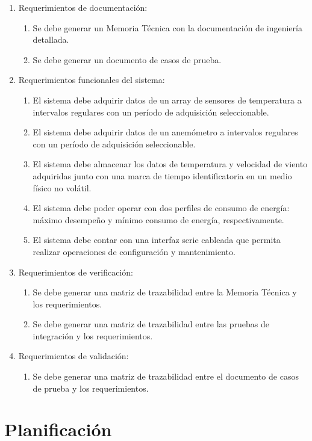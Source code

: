 \begin{enumerate}
  \item Requerimientos de documentación:
   \begin{enumerate}
     \item Se debe generar un Memoria Técnica con la documentación de ingeniería detallada.
	   \item Se debe generar un documento de casos de prueba.
	 \end{enumerate}
	\item Requerimientos funcionales del sistema:
	\begin{enumerate}
		\item El sistema debe adquirir datos de un array de sensores de temperatura a intervalos regulares con un período de adquisición seleccionable.
		\item El sistema debe adquirir datos de un anemómetro a intervalos regulares con un período de adquisición seleccionable.
		\item El sistema debe almacenar los datos de temperatura y velocidad de viento adquiridas junto con una marca de tiempo identificatoria en un medio físico no volátil.
		\item El sistema debe poder operar con dos perfiles de consumo de energía: máximo desempeño y mínimo consumo de energía, respectivamente.
		\item El sistema debe contar con una interfaz serie cableada que permita realizar operaciones de configuración y mantenimiento.
	\end{enumerate}
	\item Requerimientos de verificación:
	\begin{enumerate}
		\item Se debe generar una matriz de trazabilidad entre la Memoria Técnica y los requerimientos.
		\item Se debe generar una matriz de trazabilidad entre las pruebas de integración y los requerimientos.
	\end{enumerate}
	\item Requerimientos de validación:
	\begin{enumerate}
	  \item Se debe generar una matriz de trazabilidad entre el documento de casos de prueba y los requerimientos.
  \end{enumerate}
\end{enumerate}


\section{Planificación}
\label{sec:plan}


